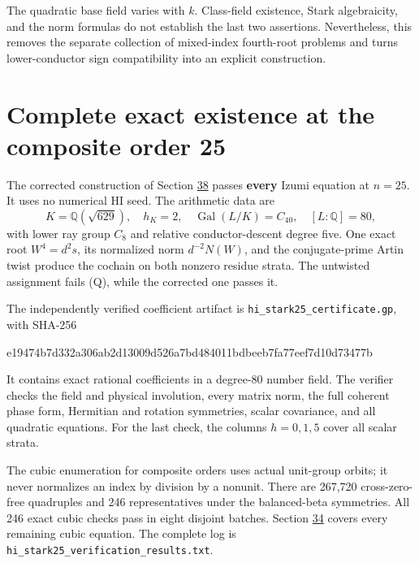 \documentclass[11pt,reqno]{amsart}
\theoremstyle{plain}
\begin{document}
The quadratic base field varies with \(k\). Class-field existence,
Stark algebraicity, and the norm formulas do not establish the last
two assertions. Nevertheless, this removes the separate collection
of mixed-index fourth-root problems and turns lower-conductor sign
compatibility into an explicit construction.

\section{Complete exact existence at the composite order 25}\label{sec:39}

The corrected construction of Section \hyperref[sec:38]{38} passes \textbf{every} Izumi
equation at \(n=25\). It uses no numerical HI seed. The arithmetic
data are
\[
 K=\mathbb Q(\sqrt{629}),\quad h_K=2,\quad
 \operatorname{Gal}(L/K)=C_{40},\quad [L:\mathbb Q]=80,
\]
with lower ray group \(C_8\) and relative conductor-descent degree
five. One exact root \(W^4=d^2s\), its normalized norm
\(d^{-2}N(W)\), and the conjugate-prime Artin twist produce the
cochain on both nonzero residue strata. The untwisted assignment
fails (Q), while the corrected one passes it.

The independently verified coefficient artifact is
\texttt{hi\_\allowbreak stark25\_\allowbreak certificate.gp}, with SHA-256
\begin{code}
e19474b7d332a306ab2d13009d526a7bd484011bdbeeb7fa77eef7d10d73477b
\end{code}
It contains exact rational coefficients in a degree-80 number field.
The verifier checks the field and physical involution, every matrix
norm, the full coherent phase form, Hermitian and rotation symmetries,
scalar covariance, and all quadratic equations. For the last check,
the columns \(h=0,1,5\) cover all scalar strata.

The cubic enumeration for composite orders uses actual unit-group
orbits; it never normalizes an index by division by a nonunit.
There are 267,720 cross-zero-free quadruples and 246 representatives
under the balanced-beta symmetries. All 246 exact cubic checks pass
in eight disjoint batches. Section \hyperref[sec:34]{34} covers every remaining cubic
equation. The complete log is \texttt{hi\_\allowbreak stark25\_\allowbreak verification\_\allowbreak results.txt}.
\end{document}
